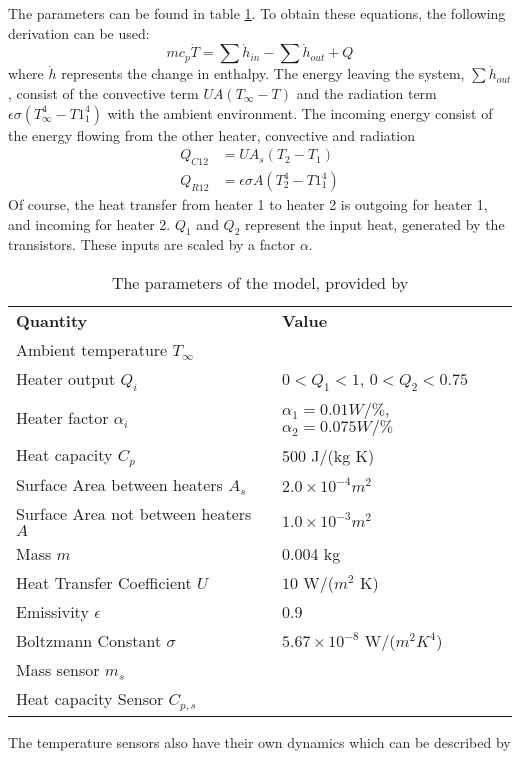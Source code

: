 The parameters can be found in table \ref{tab:theModelPara}. To obtain these equations, the following derivation can be used:
$$
    mc_p\dot{T} = \sum\dot{h}_{in} - \sum\dot{h}_{out} + Q
$$
where $\dot{h}$ represents the change in enthalpy. The energy leaving the system, $ \sum\dot{h}_{out}$, consist of the convective term  $U A (T_{\infty} - T)$ and the radiation term $\epsilon\sigma(T^4_{\infty} - T1^4_1)$ with the ambient environment. The incoming energy consist of the energy flowing from the other heater, convective and radiation
\begin{align}
    Q_{C12} &= U A_s (T_2 -T_1) \nonumber \\
    Q_{R12} &= \epsilon\sigma A (T^4_{2} - T1^4_1) \nonumber
\end{align}
Of course, the heat transfer from heater 1 to heater 2 is outgoing for heater 1, and incoming for heater 2. $Q_1$ and $Q_2$ represent the input heat, generated by the transistors. These inputs are scaled by a factor $\alpha$.
\begin{table}[ht]
    \centering
    \caption{The parameters of the model, provided by \cite{APMonitor}}
    \begin{tabular}{l|l}
    \textbf{Quantity} & \textbf{Value} \\
    Ambient temperature $T_{\infty}$    & \\
    Heater output $Q_i$ & $0<Q_1<1$, $0<Q_2<0.75$\\
    Heater factor $\alpha_i$ & $\alpha_1 = 0.01W/\%$, $\alpha_2 = 0.075W/\%$ \\
    Heat capacity $C_p$ & 500 J/(kg K)\\
    Surface Area between heaters $A_s$ & $2.0\times10^{-4} m^2$\\
    Surface Area not between heaters $A$ & $1.0\times10^{-3} m^2$\\
    Mass $m$ & 0.004 kg\\
    Heat Transfer Coefficient $U$ & $10$ W/($m^2$ K) \\
    Emissivity $\epsilon$ & 0.9\\
    Boltzmann Constant $\sigma$ & $5.67\times10^{-8}$ W/($m^2 K^4$) \\
    Mass sensor $m_s$ & \\
    Heat capacity Sensor $C_{p,s}$ & \\
    \end{tabular}
    \label{tab:theModelPara}
\end{table}
The temperature sensors also have their own dynamics which can be described by
